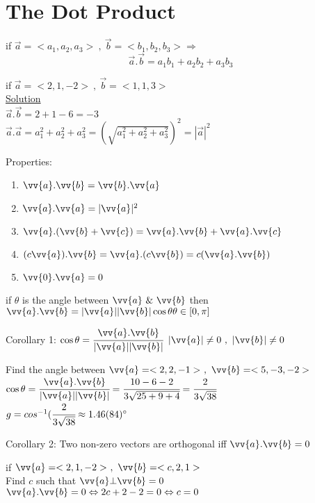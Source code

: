 \section{The Dot Product}
\begin{definition}
if $\overrightarrow{a}=<a_1,a_2,a_3>~,~\overrightarrow{b}=<b_1,b_2,b_3>\Rightarrow$
$$\overrightarrow{a}.\overrightarrow{b}=a_1b_1+a_2b_2+a_3b_3$$
\end{definition} 
\begin{example}
if $\overrightarrow{a}=<2,1,-2>~,~\overrightarrow{b}=<1,1,3>$\\
{\color{smalt(darkpowderblue)}\underline{Solution}}\\
$\overrightarrow{a}.\overrightarrow{b}=2+1-6=-3$\\
$\overrightarrow{a}.\overrightarrow{a}=a_1^2+a_2^2+a_3^2=(\sqrt{a_1^2+a_2^2+a_3^2})^2=|\overrightarrow{a}|^2$
\end{example}
\noindent{\color{smalt(darkpowderblue)}\rule{\linewidth}{.2mm}}
{\color{smalt(darkpowderblue)}Properties:}
\begin{enumerate}
    \item $\vv{a}.\vv{b}=\vv{b}.\vv{a}$
    \item $\vv{a}.\vv{a}=|\vv{a}|^2$
    \item $\vv{a}.(\vv{b}+\vv{c})=\vv{a}.\vv{b}+\vv{a}.\vv{c}$
    \item $(c\vv{a}).\vv{b}=\vv{a}.(c\vv{b})=c(\vv{a}.\vv{b})$
    \item $\vv{0}.\vv{a}=0$
\end{enumerate}
\begin{theorem}
if $\theta$ is the angle between $\vv{a}~\&~\vv{b}$ then $\vv{a}.\vv{b}=|\vv{a}||\vv{b}|\cos\theta\\
\theta\in[0,\pi]$
\end{theorem}
{\color{smalt(darkpowderblue)}Corollary 1:}
$\cos{\theta}=\cfrac{\vv{a}.\vv{b}}{|\vv{a}||\vv{b}|}$ $|\vv{a}|\neq0~,~|\vv{b}|\neq0$\\
\begin{example}
Find the angle between $\vv{a}=<2,2,-1>~,~\vv{b}=<5,-3,-2>$\\
$\cos{\theta}=\cfrac{\vv{a}.\vv{b}}{|\vv{a}||\vv{b}|}=\cfrac{10-6-2}{3\sqrt{25+9+4}}=\cfrac{2}{3\sqrt{38}}$\\
$g=cos^{-1}(\cfrac{2}{3\sqrt{38}}\approx 1.46(84)^\circ$
\end{example}
\noindent{\color{smalt(darkpowderblue)}\rule{\linewidth}{.2mm}}
{\color{smalt(darkpowderblue)}Corollary 2:} Two non-zero vectors are orthogonal iff $\vv{a}.\vv{b}=0$
\begin{example}
if $\vv{a}=<2,1,-2>~,~\vv{b}=<c,2,1>$\\
Find $c$ such that $\vv{a}\bot\vv{b}=0$\\
$\vv{a}.\vv{b}=0\Leftrightarrow 2c+2-2=0\Leftrightarrow c=0$
\end{example}